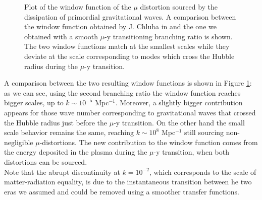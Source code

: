 \begin{figure}
    \centering
{}
\caption{Plot of the window function of the $\mu$ distortion sourced by the dissipation of primordial gravitational waves. A comparison between the window function obtained by J. Chluba in \cite{Chluba_tens_diss} and the one we obtained with a smooth $\mu$-y transitioning branching ratio is shown. The two window functions match at the smallest scales while they deviate at the scale corresponding to modes which cross the Hubble radius during the $\mu$-y transition.}
\label{fig:mu_window}
\end{figure}
A comparison between the two resulting window functions is shown in Figure \ref{fig:mu_window}: as we can see, using the second branching ratio the window function reaches bigger scales, up to $k\sim10^{-5}$ Mpc$^{-1}$. Moreover, a slightly bigger contribution appears for those wave number corresponding to gravitational waves that crossed the Hubble radius just before the $\mu$-y transition. On the other hand the small scale behavior remains the same, reaching $k\sim10^{8}$ Mpc$^{-1}$ still sourcing non-negligible $\mu$-distortions. The new contribution to the window function comes from the energy deposited in the plasma during the $\mu$-y transition, when both distortions can be sourced.\\
Note that the abrupt discontinuity at $k=10^{-2}$, which corresponds to the scale of matter-radiation equality, is due to the instantaneous transition between he two eras we assumed and could be removed using a smoother transfer functions.

